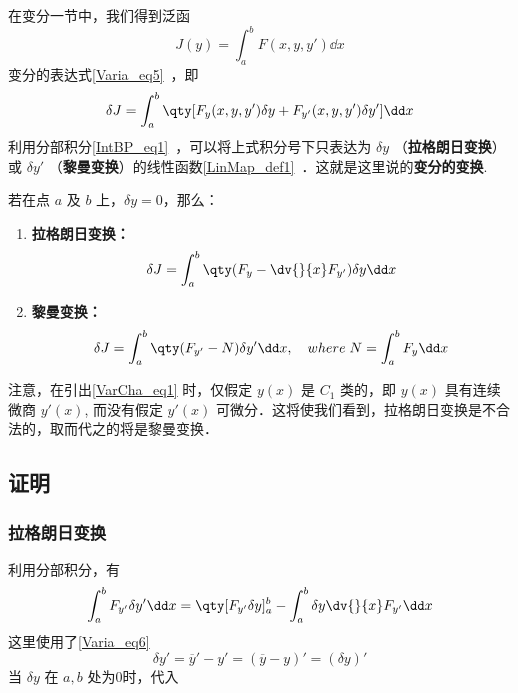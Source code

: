 
在变分一节中，我们得到泛函 
\begin{equation}
J(y)=\int_a^bF(x,y,y')\dd x
\end{equation}
变分的表达式\autoref{Varia_eq5}~，即
\begin{equation}\label{VarCha_eq1}
\delta J=\int_a^b\qty[F_y(x,y,y')\delta y+F_{y'}(x,y,y')\delta y']\dd x
\end{equation}
利用分部积分\autoref{IntBP_eq1}~，可以将上式积分号下只表达为 $\delta y$ （\textbf{拉格朗日变换}）或 $\delta y'$ （\textbf{黎曼变换}）的线性函数\autoref{LinMap_def1}~．这就是这里说的\textbf{变分的变换}.

若在点 $a$ 及 $b$ 上，$\delta y=0$，那么：
\begin{enumerate}
\item \textbf{拉格朗日变换：}
\begin{equation}
\delta J=\int_a^b\qty(F_y-\dv{}{x}F_{y'})\delta y\dd x
\end{equation}
\item \textbf{黎曼变换：}
\begin{equation}
\delta J=\int_a^b\qty(F_{y'}-N)\delta y'\dd x ,\quad where \;N=\int_a^bF_y\dd x
\end{equation}
\end{enumerate}


注意，在引出\autoref{VarCha_eq1} 时，仅假定 $y(x)$ 是 $C_1$ 类的，即 $y(x)$ 具有连续微商 $y'(x)$, 而没有假定 $y'(x)$ 可微分．这将使我们看到，拉格朗日变换是不合法的，取而代之的将是黎曼变换． 

\subsection{证明}
\subsubsection{拉格朗日变换}
利用分部积分，有
\begin{equation}\label{VarCha_eq2}
\int_a^bF_{y'}\delta y'\dd x=\qty[F_{y'}\delta y]_a^b-\int_a^b\delta y\dv{}{x}F_{y'}\dd x
\end{equation}
这里使用了\autoref{Varia_eq6}~
\begin{equation}
\delta y'=\overline{y}'-y'=(\overline{y}-y)'=(\delta y)'
\end{equation}
当 $\delta y$ 在 $a,b$ 处为0时，代入